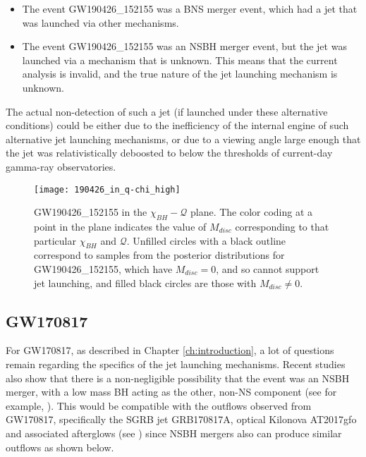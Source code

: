         \begin{itemize}

            \item The event GW190426\_152155 was a BNS merger event, which had a jet
                that was launched via other mechanisms.

            \item The event GW190426\_152155 was an NSBH merger event, but the jet was
                launched via a mechanism that is unknown. This means that the current
                analysis is invalid, and the true nature of the jet launching mechanism
                is unknown.

        \end{itemize}

        The actual non-detection of such a jet (if launched under these alternative
        conditions) could be either due to the inefficiency of the internal engine of
        such alternative jet launching mechanisms, or due to a viewing angle large
        enough that the jet was relativistically deboosted to below the thresholds of
        current-day gamma-ray observatories.

        \begin{figure}[H]
            \centering
            \texttt{[image: 190426\_in\_q-chi\_high]}
            \caption[GW190426 in the $\chi_{BH}-\mathcal{Q}$ plane]
            {
                GW190426\_152155 in the $\chi_{BH}-\mathcal{Q}$ plane. The color coding
                at a point in the plane indicates the value of $M_{disc}$ corresponding
                to that particular $\chi_{BH}$ and $\mathcal{Q}$.  Unfilled circles with
                a black outline correspond to samples from the posterior distributions
                for GW190426\_152155, which have $M_{disc} = 0$, and so cannot support
                jet launching, and filled black circles are those with $M_{disc} \neq
                0$.
            }
            \label{fig:mdisc_q_190426}
        \end{figure}

    \subsection{GW170817}

        For GW170817, as described in Chapter \ref{ch:introduction}, a lot of questions
        remain regarding the specifics of the jet launching mechanisms. Recent studies
        also show that there is a non-negligible possibility that the event was an NSBH
        merger, with a low mass BH acting as the other, non-NS component (see for
        example, \cite{hinderer_2019}). This would be compatible with the outflows
        observed from GW170817, specifically the SGRB jet GRB170817A, optical Kilonova
        AT2017gfo and associated afterglows (see \cite{abbott_2017}) since NSBH mergers
        also can produce similar outflows as shown below.

